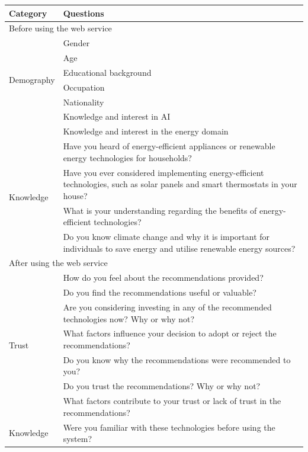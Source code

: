 \begin{center}
  \small
  \begin{longtable}{ | p{} | p{} | }
    \hline
    \textbf{Category} & \textbf{Questions} \\
    \hline
    \multicolumn{2}{|l|}{\cellcolor{lightgray}Before using the web service} \\
    \hline
    \multirow{6}{4em}{Demography} & Gender \\
    & Age \\
    & Educational background \\
    & Occupation \\
    & Nationality \\
    & Knowledge and interest in AI \\
    & Knowledge and interest in the energy domain \\
    \hline
    \multirow{4}{4em}{Knowledge} & Have you heard of energy-efficient appliances or renewable energy technologies for households? \\
    & Have you ever considered implementing energy-efficient technologies, such as solar panels and smart thermostats in your house? \\
    & What is your understanding regarding the benefits of energy-efficient technologies? \\
    & Do you know climate change and why it is important for individuals to save energy and utilise renewable energy sources? \\
    \hline
    \multicolumn{2}{|l|}{\cellcolor{lightgray}After using the web service} \\
    \hline
    \multirow{7}{4em}{Trust} & How do you feel about the recommendations provided? \\
    & Do you find the recommendations useful or valuable? \\
    & Are you considering investing in any of the recommended technologies now? Why or why not? \\
    & What factors influence your decision to adopt or reject the recommendations? \\
    & Do you know why the recommendations were recommended to you? \\
    & Do you trust the recommendations? Why or why not? \\
    & What factors contribute to your trust or lack of trust in the recommendations? \\
    \hline
    \multirow{4}{4em}{Knowledge} & Were you familiar with these technologies before using the system? \\

\end{longtable}
\end{center}
